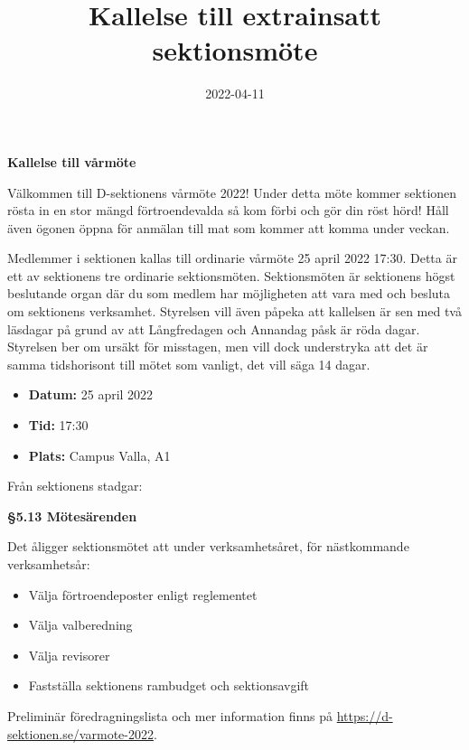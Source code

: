 \documentclass{datateknologsektionen-document}
\title{Kallelse till extrainsatt sektionsmöte}
\date{2022-04-11}
\begin{document}





\large
\begin{center}
  \vspace*{5mm}
  {\LARGE\bfseries Kallelse till vårmöte}
  \vspace{2mm}
\end{center}

Välkommen till D-sektionens vårmöte 2022! Under detta möte kommer sektionen rösta in en stor mängd förtroendevalda så kom förbi och gör din röst hörd! Håll även ögonen öppna för anmälan till mat som kommer att komma under veckan.

Medlemmer i sektionen kallas till ordinarie vårmöte 25 april 2022 17:30.
Detta är ett av sektionens tre ordinarie sektionsmöten. Sektionsmöten är sektionens högst beslutande organ där du som medlem har möjligheten att vara med och besluta om sektionens verksamhet. Styrelsen vill även påpeka att kallelsen är sen med två läsdagar på grund av att Långfredagen och Annandag påsk är röda dagar. Styrelsen ber om ursäkt för misstagen, men vill dock understryka att det är samma tidshorisont till mötet som vanligt, det vill säga 14 dagar.

\vspace*{4mm}
\begin{itemize}
  \item \textbf{Datum:} 25 april 2022
  \item \textbf{Tid:} 17:30
  \item \textbf{Plats:} Campus Valla, A1
\end{itemize}

Från sektionens stadgar:

\textbf{§5.13 Mötesärenden}

Det åligger sektionsmötet att under verksamhetsåret, för nästkommande verksamhetsår:
\begin{itemize}
  \item Välja förtroendeposter enligt reglementet
  \item Välja valberedning
  \item Välja revisorer
  \item Fastställa sektionens rambudget och sektionsavgift
\end{itemize}
Preliminär föredragningslista och mer information finns på \url{https://d-sektionen.se/varmote-2022}. 
\end{document}
